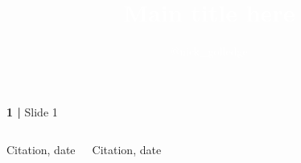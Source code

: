 \documentclass[8pt,leqno]{beamer}
\title[\textcolor{gray}{\textbf{Running title here}}] 
{\textcolor{white}{\Huge{Main title here}}}
\author[\textcolor{gray}{\faTwitter \hspace*{0.15cm} @nick\_golledge}] 
{\textcolor{white}{\large{\faTwitter \hspace*{0.15cm} @nick\_golledge\inst{1}}\\\vspace*{0.0cm}
%
%
%
}}
\institute[\textcolor{gray}{VUW}] %
{\textcolor{white}{
\inst{{1}}{Antarctic Research Centre, Victoria University of Wellington, New Zealand}\\
}


  \vspace*{1.5cm}
%  
% 

}
\date[\textcolor{gray}{Event name here}] %
{\\\vspace*{0.5cm}




\hspace*{-0.9cm} \texttt{[image: ./logos/ASP\_Hub\_COL\_black.png]}\hspace*{0.2cm} \texttt{[image: ./logos/VUW-logo-new.jpg]}
\hspace*{0.0cm} \texttt{[image: ./logos/mbie-logo.png]} 
\hspace*{0.0cm} \texttt{[image: ./logos/GNS\_logo.jpg]}
\hspace*{0.2cm} \texttt{[image: ./logos/niwa-logo.png]}
}
\begin{document}
\newcommand{\movies}{off}






\begin{frame}
  \titlepage
\end{frame}





\begin{frame}{\textbf{1 |} Slide 1}

\begin{columns}

\column[c]{5cm}
\centering\tiny{Citation, date}


\column[c]{5cm}
\centering\tiny{Citation, date}


\end{columns}

\end{frame}


\end{document}
